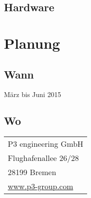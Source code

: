   \subsection{Hardware}
  \label{ssec:hardware}


\section{Planung}
\label{sec:planung}

  \subsection{Wann}
  \label{ssec:wann}
    März bis Juni 2015

  \subsection{Wo}
  \label{ssec:wo}
    \begin{tabular}{l}
      P3 engineering GmbH\\
      Flughafenallee 26/28\\
      28199 Bremen\\
      \href{www.p3-group.com}{www.p3-group.com}\\
    \end{tabular}

